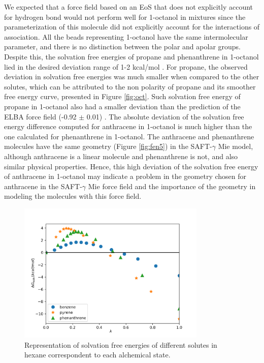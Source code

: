 We expected that a force field based on an EoS that does not explicitly account for hydrogen bond would not perform well for 1-octanol in mixtures since the parameterization of this molecule did not explicitly account for the interactions of association. All the beads representing 1-octanol have the same intermolecular parameter, and there is no distinction between the polar and apolar groups. Despite this, the solvation free energies of propane and phenanthrene in 1-octanol lied in the desired deviation range of 1-2 kcal/mol \cite{doimobley}. For propane, the observed deviation in solvation free energies was much smaller when compared to the other solutes, which can be attributed to the non polarity of propane and its smoother free energy curve, presented in Figure \ref{fig:oct}. Such solvation free energy of propane in 1-octanol also had a smaller deviation than the prediction of the ELBA force field (-0.92 $\pm$ 0.01) \cite{doi:10.1021/acs.jctc.5b00963}. The absolute deviation of the solvation free energy difference computed for anthracene in 1-octanol is much higher than the one calculated for phenanthrene in 1-octanol. The anthracene and phenanthrene molecules have the same geometry (Figure \ref{fig:fen5}) in the SAFT-$\gamma$ Mie model, although anthracene is a linear molecule and phenanthrene is not, and also similar physical properties. Hence, this high deviation of the solvation free energy of anthracene in 1-octanol may indicate a problem in the geometry chosen for anthracene in the SAFT-$\gamma$ Mie force field and the importance of the geometry in modeling the molecules with this force field.      

\begin{figure}[H]
	\centering
	\includegraphics[width=0.8\textwidth]{Figures/hex}
	\caption{Representation of solvation free energies of different solutes in hexane correspondent to each alchemical state.}
	\label{fig:hex}
\end{figure}

